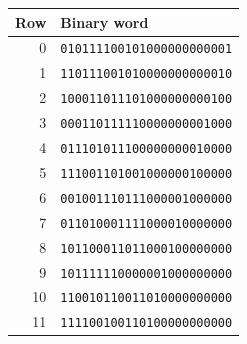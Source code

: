 \begin{tabular}{rl}
\toprule
Row & Binary word\\
\midrule
0 & \texttt{010111100101000000000001}\\
1 & \texttt{110111001010000000000010}\\
2 & \texttt{100011011101000000000100}\\
3 & \texttt{000110111110000000001000}\\
4 & \texttt{011101011100000000010000}\\
5 & \texttt{111001101001000000100000}\\
6 & \texttt{001001110111000001000000}\\
7 & \texttt{011010001111000010000000}\\
8 & \texttt{101100011011000100000000}\\
9 & \texttt{101111110000001000000000}\\
10 & \texttt{110010110011010000000000}\\
11 & \texttt{111100100110100000000000}\\
\bottomrule
\end{tabular}
